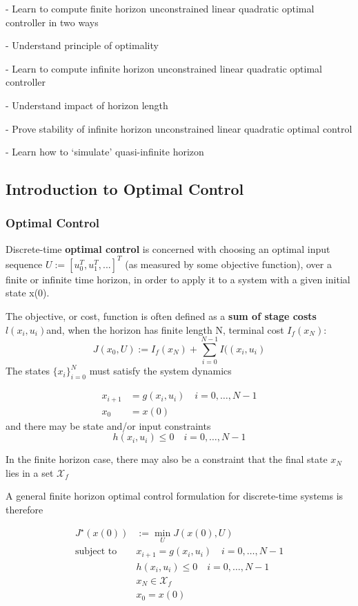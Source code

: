 - Learn to compute finite horizon
unconstrained linear quadratic optimal controller in two ways

- Understand principle of optimality

- Learn to compute infinite horizon
unconstrained linear quadratic optimal controller

- Understand impact of horizon length

- Prove stability of infinite horizon
unconstrained linear quadratic optimal control

- Learn how to ‘simulate’ quasi-infinite horizon

\subsection{Introduction to Optimal Control}

\subsubsection{Optimal Control}
Discrete-time \textbf{optimal control} is concerned with
choosing an optimal input sequence
$U := [u_0^T, u_1^T,...]^T$ %
(as measured by some objective function),
over a finite or infinite time horizon,
in order to apply it to a system with a given initial state x(0).

The objective, or cost, function is often defined as a
\textbf{sum of stage costs} $l(x_i,u_i)$and,
when the horizon has finite length N,
terminal cost $I_f(x_N)$:
$$
	J(x_0,U) :=  I_f(x_N) +
	\sum_{i=0}^{N-1}I((x_i,u_i)
$$
The states $\{x_i\}_{i=0}^N$ must satisfy the system dynamics

$$\begin{aligned}
		x_{i+1} & = g(x_i,u_i )
		\quad i = 0,\dots,N-1   \\
		x_0     & = x(0)
	\end{aligned}$$
and there may be state and/or input constraints
$$
	h(x_i,u_i)\le 0
	\quad i = 0,\dots,N-1
$$

In the finite horizon case,
there may also be a constraint that
the final state $x_N$ lies in a set $\mathcal{X}_f$

A general finite horizon optimal control formulation
for discrete-time systems is therefore

$$\begin{aligned}
		J^\star(x(0)) & :=  \min_{U}J(x(0),U)                    \\
		\text{subject to  }
		              & x_{i+1}                = g(x_i,u_i )
		\quad i  = 0,\dots,N-1                                   \\
		              & h(x_i,u_i)             \le 0
		\quad i  = 0,\dots,N-1                                   \\
		              & x_N                    \in \mathcal{X}_f \\
		              & x_0                    = x(0)
	\end{aligned}$$



